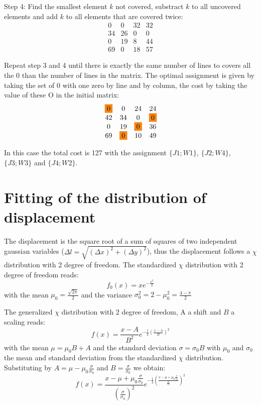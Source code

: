 \begin{appendices}
        Step 4: Find the smallest element $k$ not covered, substract $k$ to all uncovered elements and add $k$ to all elements that are covered twice:
        $$\begin{matrix}
        0 & 0 & 32 & 32  \\
        34 & 26 & 0 & 0  \\
        0 & 19 & 8 & 44  \\
        69 & 0 & 18 & 57
        \end{matrix}$$

        Repeat step 3 and 4 until there is exactly the same number of lines to covers all the 0 than the number of lines in the matrix. The optimal assignment is given by taking the set of 0 with one zero by line and by column, the cost by taking the value of these O in the initial matrix:
        $$\begin{matrix}
        \colorbox{BurntOrange}{0} & 0 & 24 & 24 \\
        42 & 34 & 0 & \colorbox{BurntOrange}{0} \\
        0 & 19 & \colorbox{BurntOrange}{0} & 36 \\
        69 & \colorbox{BurntOrange}{0} & 10 & 49
        \end{matrix}$$

        \noindent In this case the total cost is 127 with the assignment $\{J1; W1\}$, $\{J2; W4\}$, $\{J3; W3\}$ and $\{J4; W2\}$.


        \chapter{Fitting of the distribution of displacement}
        \label{part_1:annexe_chi}

        The displacement is the square root of a sum of squares of two independent gaussian variables ($\Delta l = \sqrt{(\Delta x)^{2} + (\Delta y)^{2}}$), thus the displacement follows a $\chi$ distribution with 2 degree of freedom.
        The standardized $\chi$ distribution with 2 degree of freedom reads:
        \begin{equation}
        f_0(x)=xe^{-\frac{x^2}{2}}
        \end{equation}
        \noindent with the mean $\mu_0=\frac{\sqrt{2\pi}}{2}$ and the variance $\sigma_0^2=2-\mu_0^2=\frac{4-\pi}{2}$

        The generalized $\chi$ distribution with 2 degree of freedom, A a shift and $B$ a scaling reads:
        $$f(x)=\frac{x-A}{B^2}e^{-\frac{1}{2}(\frac{x-A}{B})^2}$$
        \noindent with the mean $\mu=\mu_0B+A$ and the standard deviation $\sigma=\sigma_0B$ with $\mu_0$ and $\sigma_0$ the mean and standard deviation from the standardized $\chi$ distribution.
        Substituting by $A=\mu-\mu_0\frac{\sigma}{\sigma_0}$ and $B=\frac{\sigma}{\sigma_0}$ we obtain:
        \begin{equation}
        f(x)=\frac{x-\mu+\mu_0\frac{\sigma}{\sigma_0}}{(\frac{\sigma}{\sigma_0})^2}e^{-\frac{1}{2}(\frac{x-\mu+\mu_0\frac{\sigma}{\sigma_0}}{\frac{\sigma}{\sigma_0}})^2}
        \label{eq1}
        \end{equation}


\end{appendices}
